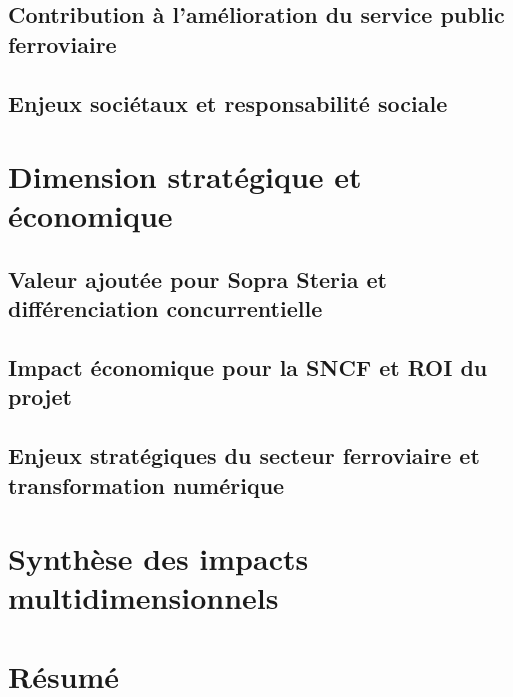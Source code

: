 \subsection{Contribution à l'amélioration du service public ferroviaire}
\subsection{Enjeux sociétaux et responsabilité sociale}

\section{Dimension stratégique et économique}
\subsection{Valeur ajoutée pour Sopra Steria et différenciation concurrentielle}
\subsection{Impact économique pour la SNCF et ROI du projet}
\subsection{Enjeux stratégiques du secteur ferroviaire et transformation numérique}

\section{Synthèse des impacts multidimensionnels}

\section{Résumé}